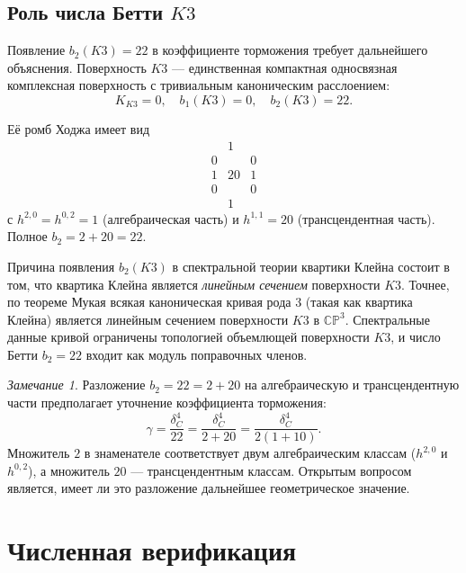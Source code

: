 \documentclass[12pt,a4paper]{article}
\theoremstyle{definition}
\theoremstyle{remark}
\newtheorem{remark}[theorem]{Замечание}
\newcommand{\CC}{\mathbb{C}}
\newcommand{\PP}{\mathbb{P}}
\begin{document}
\subsection{Роль числа Бетти $K3$}

Появление $b_2(K3) = 22$ в коэффициенте торможения требует дальнейшего объяснения. Поверхность $K3$ --- единственная компактная односвязная комплексная поверхность с тривиальным каноническим расслоением:
\begin{equation}
K_{K3} = 0, \quad b_1(K3) = 0, \quad b_2(K3) = 22.
\end{equation}

Её ромб Ходжа имеет вид
\begin{equation}
\begin{array}{ccc}
& 1 & \\
0 & & 0 \\
1 & 20 & 1 \\
0 & & 0 \\
& 1 &
\end{array}
\end{equation}
с $h^{2,0} = h^{0,2} = 1$ (алгебраическая часть) и $h^{1,1} = 20$ (трансцендентная часть). Полное $b_2 = 2 + 20 = 22$.

Причина появления $b_2(K3)$ в спектральной теории квартики Клейна состоит в том, что квартика Клейна является \emph{линейным сечением} поверхности $K3$. Точнее, по теореме Мукая всякая каноническая кривая рода $3$ (такая как квартика Клейна) является линейным сечением поверхности $K3$ в $\CC\PP^3$. Спектральные данные кривой ограничены топологией объемлющей поверхности $K3$, и число Бетти $b_2 = 22$ входит как модуль поправочных членов.

\begin{remark}
Разложение $b_2 = 22 = 2 + 20$ на алгебраическую и трансцендентную части предполагает уточнение коэффициента торможения:
\begin{equation}
\gamma = \frac{\delta_C^4}{22} = \frac{\delta_C^4}{2 + 20} = \frac{\delta_C^4}{2(1 + 10)}.
\end{equation}
Множитель $2$ в знаменателе соответствует двум алгебраическим классам ($h^{2,0}$ и $h^{0,2}$), а множитель $20$ --- трансцендентным классам. Открытым вопросом является, имеет ли это разложение дальнейшее геометрическое значение.
\end{remark}

\section{Численная верификация}
\label{sec:numerical}
\end{document}
